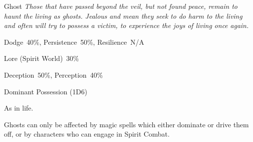 
\begin{samepage}
\begin{monsterbox}{Ghost}
	\textit{Those that have passed beyond the veil, but not found peace, remain to haunt the living as ghosts. Jealous and mean they seek to do harm to the living and often will try to possess a victim, to experience the joys of living once again.}\\
	\rpghline
	\basics[%
	powerpoints = 11,
	movementrate = 23m,
	armor = None,
	plunderrating = 0-5
	]
	\rpghline%
	\stats[ %
		STR = -,
		CON = -,
		DEX = -,
		SIZ = -,
		INT = 3D6   (11),
		POW = 3D6   (11),
		CHA = 3D6   (11)
	]
	\rpghline
	\begin{rpg-monsteraction}[Resistances]
		Dodge~40\%, Persistence~50\%, Resilience~N/A\
	\end{rpg-monsteraction}
	\begin{rpg-monsteraction}[Knowledge]
		Lore (Spirit World)~30\%
	\end{rpg-monsteraction}
	\begin{rpg-monsteraction}[Practical]
		Deception~50\%, Perception~40\%
	\end{rpg-monsteraction}
	\begin{rpg-monsteraction}
		Dominant Possession (1D6)
	\end{rpg-monsteraction}
	\begin{rpg-monsteraction}[Magic]
		As in life.
	\end{rpg-monsteraction}
	\begin{rpg-monsteraction}[Other]
		Ghosts can only be affected by magic spells which either dominate or drive them off, or by characters who can engage in Spirit Combat.
	\end{rpg-monsteraction}
\end{monsterbox}
\end{samepage}
	

